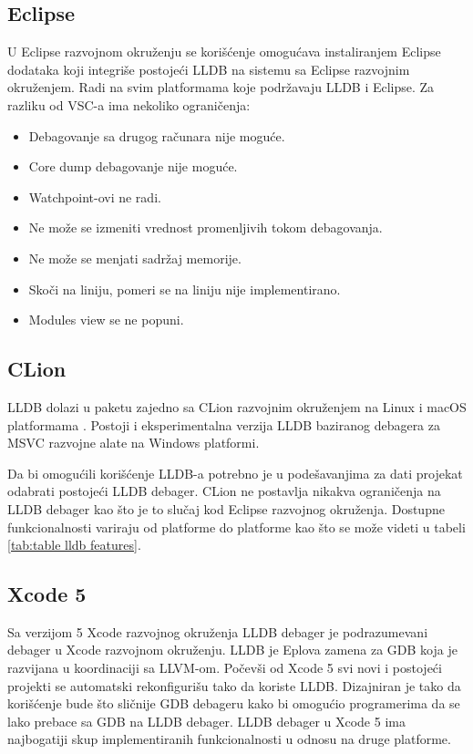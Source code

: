 \documentclass[a4paper]{article}
\begin{document}
\subsection*{Eclipse}
U Eclipse razvojnom okruženju se korišćenje omogućava instaliranjem Eclipse dodataka \cite{eclipse_plugin} koji integriše postojeći LLDB na sistemu sa Eclipse razvojnim okruženjem. Radi na svim platformama koje podržavaju LLDB i Eclipse. Za razliku od VSC-a ima nekoliko ograničenja:

\begin{itemize}
\item Debagovanje sa drugog računara nije moguće.
\item Core dump debagovanje nije moguće.
\item Watchpoint-ovi ne radi.
\item Ne može se izmeniti vrednost promenljivih tokom debagovanja.
\item Ne može se menjati sadržaj memorije.
\item Skoči na liniju, pomeri se na liniju nije implementirano.
\item Modules view se ne popuni.
\end{itemize}

\subsection*{CLion}
LLDB dolazi u paketu zajedno sa CLion razvojnim okruženjem na Linux i macOS platformama \cite{clion_lldb}. Postoji i eksperimentalna verzija LLDB baziranog debagera za MSVC razvojne alate na Windows platformi.

Da bi omogućili korišćenje LLDB-a potrebno je u podešavanjima za dati projekat odabrati postojeći LLDB debager.  CLion ne postavlja nikakva ograničenja na LLDB debager kao što je to slučaj kod Eclipse razvojnog okruženja.  Dostupne funkcionalnosti variraju od platforme do platforme kao što se može videti u tabeli \ref{tab:table lldb features}.

\subsection*{Xcode 5}
Sa verzijom 5 Xcode razvojnog okruženja LLDB debager je podrazumevani debager u Xcode razvojnom okruženju. LLDB je Eplova zamena za GDB koja je razvijana u koordinaciji sa LLVM-om. Počevši od Xcode 5 svi novi i postojeći projekti se automatski rekonfigurišu tako da koriste LLDB. Dizajniran je tako da korišćenje bude što sličnije GDB debageru kako bi omogućio programerima da se lako prebace sa GDB na LLDB debager. LLDB debager u Xcode 5 ima najbogatiji skup implementiranih funkcionalnosti u odnosu na druge platforme.
\end{document}
